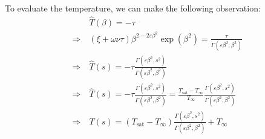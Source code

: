 \documentclass{article}
\numberwithin{equation}{section}
\newcommand{\dimless}[1]{\hat{#1}}
\begin{document}
To evaluate the temperature, we can make the following observation:
\begin{equation}
    \begin{split}
        &\dimless{T}(\beta) = -\tau \\
        \Rightarrow\ &
        (\xi + \omega \nu \tau)
        \beta^{2 - 2 \varepsilon \beta^2}
        \exp\left(\beta^2\right)
        = \frac{\tau}{\Gamma(\varepsilon \beta^2, \beta^2)} \\
        \Rightarrow\ &
        \dimless{T}(s) =
        -\tau \frac{\Gamma(\varepsilon \beta^2, s^2)}{\Gamma(\varepsilon \beta^2, \beta^2)} \\
        \Rightarrow\ &
        \dimless{T}(s) =
        -\tau \frac{\Gamma(\varepsilon \beta^2, s^2)}
                   {\Gamma(\varepsilon \beta^2, \beta^2)} =
        \frac{T_\text{sat} - T_\infty}{T_\infty}
        \frac{\Gamma(\varepsilon \beta^2, s^2)}
             {\Gamma(\varepsilon \beta^2, \beta^2)} \\
        \Rightarrow\ &
        T(s) =
        (T_\text{sat} - T_\infty)
        \frac{\Gamma(\varepsilon \beta^2, s^2)}
             {\Gamma(\varepsilon \beta^2, \beta^2)} + T_\infty
    \end{split}
\end{equation}

\newpage
\printbibliography
\end{document}
